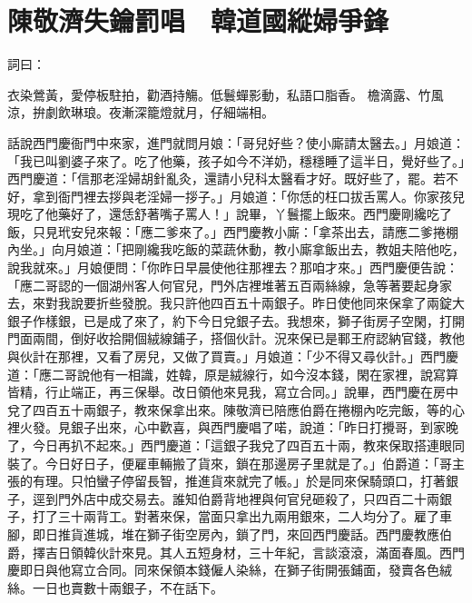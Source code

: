 %

\chapter{陳敬濟失鑰罰唱　韓道國縱婦爭鋒}

\begin{showcontents}{}


詞曰：

衣染鶯黃，愛停板駐拍，勸酒持觴。低鬟蟬影動，私語口脂香。 檐滴露、竹風涼，拚劇飲琳琅。夜漸深籠燈就月，仔細端相。

話說西門慶衙門中來家，進門就問月娘：「哥兒好些？使小廝請太醫去。」月娘道：「我已叫劉婆子來了。吃了他藥，孩子如今不洋奶，穩穩睡了這半日，覺好些了。」西門慶道：「信那老淫婦胡針亂灸，還請小兒科太醫看才好。既好些了，罷。若不好，拿到衙門裡去拶與老淫婦一拶子。」月娘道：「你恁的枉口拔舌罵人。你家孩兒現吃了他藥好了，還恁舒著嘴子罵人！」說畢，丫鬟擺上飯來。西門慶剛纔吃了飯，只見玳安兒來報：「應二爹來了。」西門慶教小廝：「拿茶出去，請應二爹捲棚內坐。」向月娘道：「把剛纔我吃飯的菜蔬休動，教小廝拿飯出去，教姐夫陪他吃，說我就來。」月娘便問：「你昨日早晨使他往那裡去？那咱才來。」西門慶便告說：「應二哥認的一個湖州客人何官兒，門外店裡堆著五百兩絲線，急等著要起身家去，來對我說要折些發脫。我只許他四百五十兩銀子。昨日使他同來保拿了兩錠大銀子作樣銀，已是成了來了，約下今日兌銀子去。我想來，獅子街房子空閑，打開門面兩間，倒好收拾開個絨線鋪子，搭個伙計。況來保已是鄆王府認納官錢，教他與伙計在那裡，又看了房兒，又做了買賣。」月娘道：「少不得又尋伙計。」西門慶道：「應二哥說他有一相識，姓韓，原是絨線行，如今沒本錢，閑在家裡，說寫算皆精，行止端正，再三保舉。改日領他來見我，寫立合同。」說畢，西門慶在房中兌了四百五十兩銀子，教來保拿出來。陳敬濟已陪應伯爵在捲棚內吃完飯，等的心裡火發。見銀子出來，心中歡喜，與西門慶唱了喏，說道：「昨日打攪哥，到家晚了，今日再扒不起來。」西門慶道：「這銀子我兌了四百五十兩，教來保取搭連眼同裝了。今日好日子，便雇車輛搬了貨來，鎖在那邊房子里就是了。」伯爵道：「哥主張的有理。只怕蠻子停留長智，推進貨來就完了帳。」於是同來保騎頭口，打著銀子，逕到門外店中成交易去。誰知伯爵背地裡與何官兒砸殺了，只四百二十兩銀子，打了三十兩背工。對著來保，當面只拿出九兩用銀來，二人均分了。雇了車腳，即日推貨進城，堆在獅子街空房內，鎖了門，來回西門慶話。西門慶教應伯爵，擇吉日領韓伙計來見。其人五短身材，三十年紀，言談滾滾，滿面春風。西門慶即日與他寫立合同。同來保領本錢僱人染絲，在獅子街開張鋪面，發賣各色絨絲。一日也賣數十兩銀子，不在話下。


\end{showcontents}

